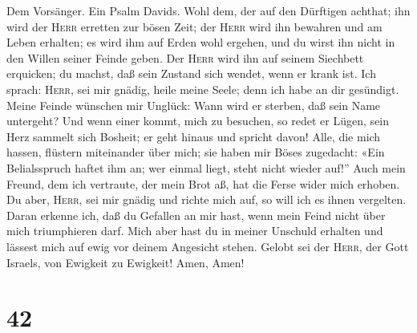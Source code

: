  Dem Vorsänger. Ein Psalm Davids. Wohl dem, der auf den
Dürftigen achthat; ihn wird der \textsc{Herr} erretten zur bösen Zeit;
 der \textsc{Herr} wird ihn bewahren und am Leben
erhalten; es wird ihm auf Erden wohl ergehen, und du wirst ihn nicht in
den Willen seiner Feinde geben.  Der \textsc{Herr} wird
ihn auf seinem Siechbett erquicken; du machst, daß sein Zustand sich
wendet, wenn er krank ist.  Ich sprach: \textsc{Herr}, sei
mir gnädig, heile meine Seele; denn ich habe an dir gesündigt.
 Meine Feinde wünschen mir Unglück: Wann wird er sterben,
daß sein Name untergeht?  Und wenn einer kommt, mich zu
besuchen, so redet er Lügen, sein Herz sammelt sich Bosheit; er geht
hinaus und spricht davon!  Alle, die mich hassen, flüstern
miteinander über mich; sie haben mir Böses zugedacht: 
«Ein Belialsspruch haftet ihm an; wer einmal liegt, steht nicht wieder
auf!''  Auch mein Freund, dem ich vertraute, der mein Brot
aß, hat die Ferse wider mich erhoben.  Du aber,
\textsc{Herr}, sei mir gnädig und richte mich auf, so will ich es ihnen
vergelten.  Daran erkenne ich, daß du Gefallen an mir
hast, wenn mein Feind nicht über mich triumphieren darf. 
Mich aber hast du in meiner Unschuld erhalten und lässest mich auf ewig
vor deinem Angesicht stehen.  Gelobt sei der
\textsc{Herr}, der Gott Israels, von Ewigkeit zu Ewigkeit! Amen, Amen!

\hypertarget{section-41}{%
\section{42}\label{section-41}}

